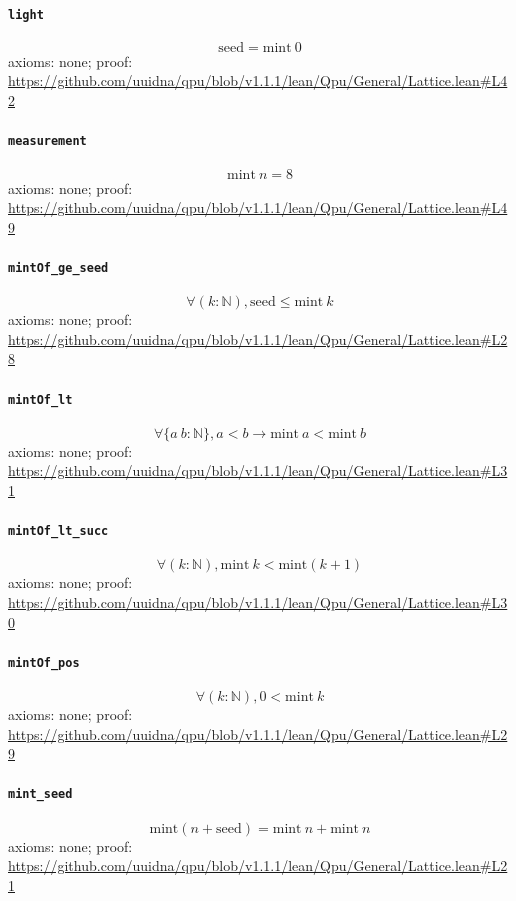 \documentclass[11pt]{article}
\begin{document}
\paragraph{\texttt{light}}
\[ \mathrm{seed} = \mathrm{mint}\ 0 \]
\noindent axioms: none; proof: \url{https://github.com/uuidna/qpu/blob/v1.1.1/lean/Qpu/General/Lattice.lean\#L42}

\paragraph{\texttt{measurement}}
\[ \mathrm{mint}\ n = 8 \]
\noindent axioms: none; proof: \url{https://github.com/uuidna/qpu/blob/v1.1.1/lean/Qpu/General/Lattice.lean\#L49}

\paragraph{\texttt{mintOf\_ge\_seed}}
\[ \forall (k : \mathbb{N}), \mathrm{seed} \le \mathrm{mint}\ k \]
\noindent axioms: none; proof: \url{https://github.com/uuidna/qpu/blob/v1.1.1/lean/Qpu/General/Lattice.lean\#L28}

\paragraph{\texttt{mintOf\_lt}}
\[ \forall \{a\ b : \mathbb{N}\}, a < b \to \mathrm{mint}\ a < \mathrm{mint}\ b \]
\noindent axioms: none; proof: \url{https://github.com/uuidna/qpu/blob/v1.1.1/lean/Qpu/General/Lattice.lean\#L31}

\paragraph{\texttt{mintOf\_lt\_succ}}
\[ \forall (k : \mathbb{N}), \mathrm{mint}\ k < \mathrm{mint} (k + 1) \]
\noindent axioms: none; proof: \url{https://github.com/uuidna/qpu/blob/v1.1.1/lean/Qpu/General/Lattice.lean\#L30}

\paragraph{\texttt{mintOf\_pos}}
\[ \forall (k : \mathbb{N}), 0 < \mathrm{mint}\ k \]
\noindent axioms: none; proof: \url{https://github.com/uuidna/qpu/blob/v1.1.1/lean/Qpu/General/Lattice.lean\#L29}

\paragraph{\texttt{mint\_seed}}
\[ \mathrm{mint} (n + \mathrm{seed}) = \mathrm{mint}\ n + \mathrm{mint}\ n \]
\noindent axioms: none; proof: \url{https://github.com/uuidna/qpu/blob/v1.1.1/lean/Qpu/General/Lattice.lean\#L21}
\end{document}
